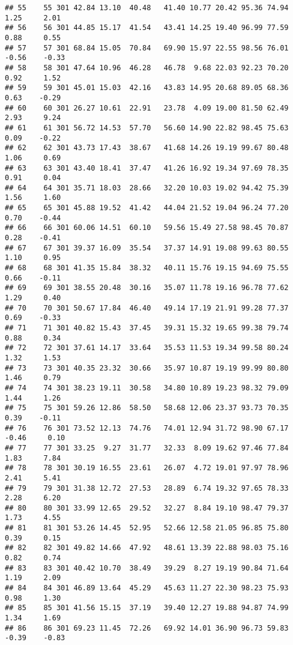 \documentclass[
]{article}
\begin{document}
\begin{verbatim}
## 55    55 301 42.84 13.10  40.48   41.40 10.77 20.42 95.36 74.94  1.25     2.01
## 56    56 301 44.85 15.17  41.54   43.41 14.25 19.40 96.99 77.59  0.88     0.55
## 57    57 301 68.84 15.05  70.84   69.90 15.97 22.55 98.56 76.01 -0.56    -0.33
## 58    58 301 47.64 10.96  46.28   46.78  9.68 22.03 92.23 70.20  0.92     1.52
## 59    59 301 45.01 15.03  42.16   43.83 14.95 20.68 89.05 68.36  0.63    -0.29
## 60    60 301 26.27 10.61  22.91   23.78  4.09 19.00 81.50 62.49  2.93     9.24
## 61    61 301 56.72 14.53  57.70   56.60 14.90 22.82 98.45 75.63  0.09    -0.22
## 62    62 301 43.73 17.43  38.67   41.68 14.26 19.19 99.67 80.48  1.06     0.69
## 63    63 301 43.40 18.41  37.47   41.26 16.92 19.34 97.69 78.35  0.91     0.04
## 64    64 301 35.71 18.03  28.66   32.20 10.03 19.02 94.42 75.39  1.56     1.60
## 65    65 301 45.88 19.52  41.42   44.04 21.52 19.04 96.24 77.20  0.70    -0.44
## 66    66 301 60.06 14.51  60.10   59.56 15.49 27.58 98.45 70.87  0.28    -0.41
## 67    67 301 39.37 16.09  35.54   37.37 14.91 19.08 99.63 80.55  1.10     0.95
## 68    68 301 41.35 15.84  38.32   40.11 15.76 19.15 94.69 75.55  0.66    -0.11
## 69    69 301 38.55 20.48  30.16   35.07 11.78 19.16 96.78 77.62  1.29     0.40
## 70    70 301 50.67 17.84  46.40   49.14 17.19 21.91 99.28 77.37  0.69    -0.33
## 71    71 301 40.82 15.43  37.45   39.31 15.32 19.65 99.38 79.74  0.88     0.34
## 72    72 301 37.61 14.17  33.64   35.53 11.53 19.34 99.58 80.24  1.32     1.53
## 73    73 301 40.35 23.32  30.66   35.97 10.87 19.19 99.99 80.80  1.46     0.79
## 74    74 301 38.23 19.11  30.58   34.80 10.89 19.23 98.32 79.09  1.44     1.26
## 75    75 301 59.26 12.86  58.50   58.68 12.06 23.37 93.73 70.35  0.39    -0.11
## 76    76 301 73.52 12.13  74.76   74.01 12.94 31.72 98.90 67.17 -0.46     0.10
## 77    77 301 33.25  9.27  31.77   32.33  8.09 19.62 97.46 77.84  1.83     7.84
## 78    78 301 30.19 16.55  23.61   26.07  4.72 19.01 97.97 78.96  2.41     5.41
## 79    79 301 31.38 12.72  27.53   28.89  6.74 19.32 97.65 78.33  2.28     6.20
## 80    80 301 33.99 12.65  29.52   32.27  8.84 19.10 98.47 79.37  1.73     4.55
## 81    81 301 53.26 14.45  52.95   52.66 12.58 21.05 96.85 75.80  0.39     0.15
## 82    82 301 49.82 14.66  47.92   48.61 13.39 22.88 98.03 75.16  0.82     0.74
## 83    83 301 40.42 10.70  38.49   39.29  8.27 19.19 90.84 71.64  1.19     2.09
## 84    84 301 46.89 13.64  45.29   45.63 11.27 22.30 98.23 75.93  0.98     1.30
## 85    85 301 41.56 15.15  37.19   39.40 12.27 19.88 94.87 74.99  1.34     1.69
## 86    86 301 69.23 11.45  72.26   69.92 14.01 36.90 96.73 59.83 -0.39    -0.83

\end{verbatim}
\end{document}
